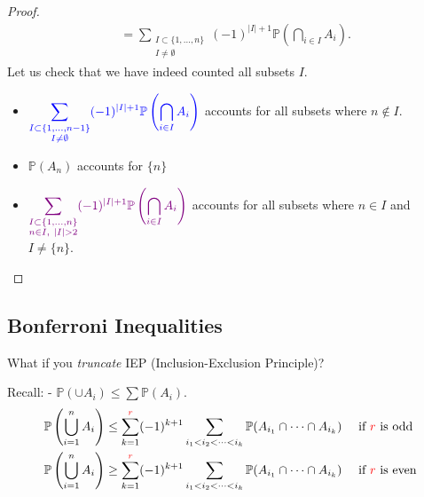 \begin{proof}
\begin{align*}
        &= \sum_{\substack{I \subset \{1, \dots, n\} \\ I \neq \emptyset}} (-1)^{|I| + 1} \mathbb{P} \left( \bigcap_{i \in I} A_i \right).
    \end{align*}
    Let us check that we have indeed counted all subsets $I$.
    \begin{itemize}
        \item $\displaystyle \mathcolor{blue}{\sum_{\substack{I \subset \{1, \dots, n - 1\} \\ I \neq \emptyset}} (-1)^{|I| + 1} \mathbb{P} \left( \bigcap_{i \in I} A_i \right)}$ accounts for all subsets where $n \notin I$.
        \item $\mathbb{P}(A_n)$ accounts for $\{n\}$
        \item $\displaystyle \mathcolor{violet}{\sum_{\substack{I \subset \{1, \dots, n\} \\ n \in I,\ |I| > 2}} (-1)^{|I| + 1} \mathbb{P} \left( \bigcap_{i \in I} A_i \right)}$ accounts for all subsets where $n \in I$ and $I \neq \{n\}$.
    \end{itemize} 
\end{proof}

\subsection{Bonferroni Inequalities}
\begin{question}
    What if you \emph{truncate} IEP (Inclusion-Exclusion Principle)?
\end{question} 

\begin{proposition}
    Recall:  - $\mathbb{P}(\cup A_i) \leq \sum \mathbb{P}(A_i)$.
    \begin{align*}
        \mathbb{P}\left(\bigcup_{i=1}^n A_i\right) &\leq \sum_{k = 1}^{\mathcolor{red} r} (-1)^{k+1} \sum_{i_1<i_2<\dots<i_k} \mathbb{P}(A_{i_1} \cap \dots \cap A_{i_k}) \quad \text{ if } \mathcolor{red} r \text{ is odd} \\
        \mathbb{P}\left(\bigcup_{i=1}^n A_i\right) &\geq \sum_{k = 1}^{\mathcolor{red} r} (-1)^{k+1} \sum_{i_1<i_2<\dots<i_k} \mathbb{P}(A_{i_1} \cap \dots \cap A_{i_k}) \quad \text{ if } \mathcolor{red} r \text{ is even}
    \end{align*} 
\end{proposition} 

